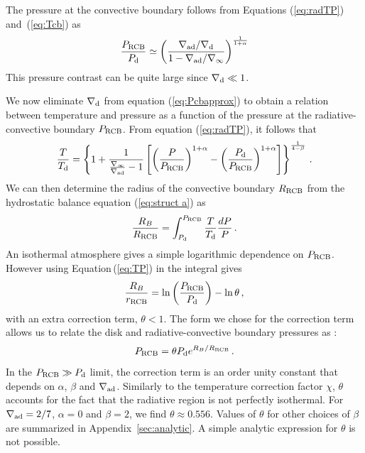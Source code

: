 \documentclass[apj]{emulateapj}
\newcommand{\delad}{\nabla_{\rm ad}}
\newcommand{\Eq}[1]{Equation\,(\ref{#1})}
\newcommand{\Eqs}[2]{Equations (\ref{#1}) and~(\ref{#2})}
\newcommand{\App}[1]{Appendix~\ref{#1}}
\newcommand{\di}{_{\rm d}}
\newcommand{\cb}{_{\rm RCB}}
\begin{document}

The pressure at the convective boundary  follows from \Eqs{eq:radTP}{eq:Tcb} as
\begin{equation}
\label{eq:Pcbapprox}
{P\cb\over P_{\rm d}} \simeq \left({\delad/\nabla\di \over 1 - \delad/\nabla_\infty}\right)^{1 \over 1 + \alpha}
\end{equation} 
This pressure contrast can be quite large since $\nabla_{\rm d} \ll 1$.
 
 We now eliminate $\nabla\di$ from equation (\ref{eq:Pcbapprox}) to obtain a relation between temperature and pressure as a function of the pressure at the radiative-convective boundary $P\cb$. From equation (\ref{eq:radTP}), it follows that
 \begin{equation}\label{eq:TP}
{T \over T_{\rm d}} = \left\{1 + {1 \over {\nabla_\infty \over \delad} - 1} \left[ \left({P \over P\cb}\right)^{1+\alpha} -  \left({P_{\rm d} \over P\cb}\right)^{1+\alpha}  \right] \right\}^{1 \over 4-\beta}\, .
\end{equation} 
 We can then determine the radius of the convective boundary $R\cb$ from the hydrostatic balance equation (\ref{eq:struct a}) as 
\begin{equation}\label{eq:RCBint}
{R_B \over R\cb} = \int_{P\di}^{P\cb} {T \over T_{\rm d}} {dP \over P}\, .
\end{equation} 
An isothermal atmosphere gives a simple logarithmic dependence on $P\cb$.  However using \Eq{eq:TP} in the integral gives
\begin{equation}\label{eq:Rcb}
{R_B \over r\cb} = \ln \left(P\cb \over P\di \right) - \ln \theta \, ,
\end{equation} 
with an extra correction term, $\theta < 1$.  The form we chose for the correction term allows us to relate the disk and radiative-convective boundary pressures as :
 \begin{equation}\label{eq:PcbRcb}
P\cb = \theta P_{\rm d} e^{R_B/R\cb} \, .
\end{equation}   
In the $P\cb \gg P_{\rm d}$ limit, the correction term is an order unity constant that depends on $\alpha$, $\beta$ and $\delad$. Similarly to the temperature correction factor $\chi$,  $\theta$ accounts for the fact that the radiative region is not perfectly isothermal. For $\delad=2/7$, $\alpha=0$ and $\beta=2$, we find $\theta \approx 0.556$. Values of $\theta$ for other choices of $\beta$ are summarized in \App{sec:analytic}.  A simple analytic expression for $\theta$ is not possible.  
\end{document}

